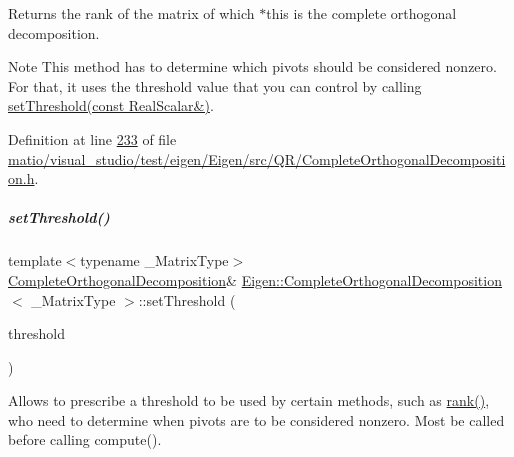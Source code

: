 \begin{DoxyReturn}{Returns}
the rank of the matrix of which $\ast$this is the complete orthogonal decomposition.
\end{DoxyReturn}
\begin{DoxyNote}{Note}
This method has to determine which pivots should be considered nonzero. For that, it uses the threshold value that you can control by calling \hyperlink{group___q_r___module_aa9c9f7cbde9d58ca5552381b70ad8d82}{set\+Threshold(const Real\+Scalar\&)}. 
\end{DoxyNote}


Definition at line \hyperlink{matio_2visual__studio_2test_2eigen_2_eigen_2src_2_q_r_2_complete_orthogonal_decomposition_8h_source_l00233}{233} of file \hyperlink{matio_2visual__studio_2test_2eigen_2_eigen_2src_2_q_r_2_complete_orthogonal_decomposition_8h_source}{matio/visual\+\_\+studio/test/eigen/\+Eigen/src/\+Q\+R/\+Complete\+Orthogonal\+Decomposition.\+h}.

\mbox{\label{group___q_r___module_aa9c9f7cbde9d58ca5552381b70ad8d82}} 
\subparagraph{\texorpdfstring{set\+Threshold()}{setThreshold()}\hspace{0.1cm}{\footnotesize\ttfamily [1/4]}}
{\footnotesize\ttfamily template$<$typename \+\_\+\+Matrix\+Type$>$ \\
\hyperlink{group___q_r___module_class_eigen_1_1_complete_orthogonal_decomposition}{Complete\+Orthogonal\+Decomposition}\& \hyperlink{group___q_r___module_class_eigen_1_1_complete_orthogonal_decomposition}{Eigen\+::\+Complete\+Orthogonal\+Decomposition}$<$ \+\_\+\+Matrix\+Type $>$\+::set\+Threshold (\begin{DoxyParamCaption}\item[{const Real\+Scalar \&}]{threshold }\end{DoxyParamCaption})\hspace{0.3cm}{\ttfamily [inline]}}

Allows to prescribe a threshold to be used by certain methods, such as \hyperlink{group___q_r___module_af348f64b26f8467a020062c22b748806}{rank()}, who need to determine when pivots are to be considered nonzero. Most be called before calling compute().

